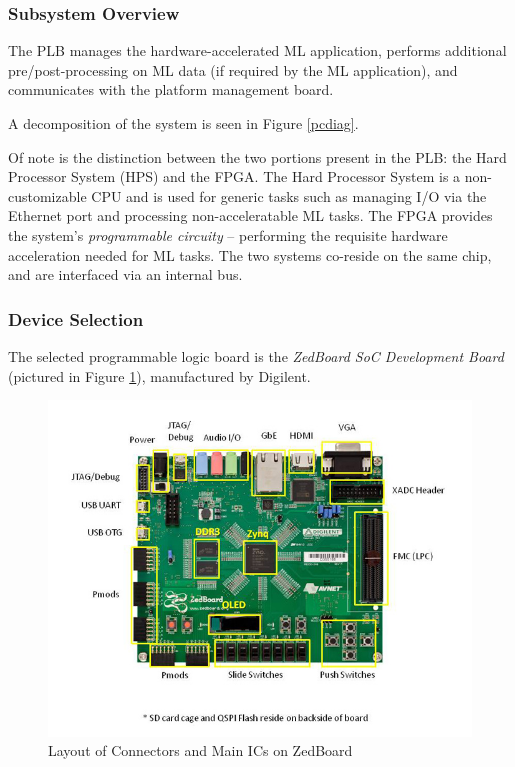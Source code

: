 \subsubsection{Subsystem Overview}
 The PLB manages the hardware-accelerated ML application, performs additional pre/post-processing on ML data (if required by the ML application), and communicates with the platform management board.

A decomposition of the system is seen in Figure \ref{pcdiag}.

Of note is the distinction between the two portions present in the PLB: the Hard Processor System (HPS) and the FPGA. The Hard Processor System is a non-customizable CPU and is used for generic tasks such as managing I/O via the Ethernet port and processing non-acceleratable ML tasks. The FPGA provides the system's \textit{programmable circuity} -- performing the requisite hardware acceleration needed for ML tasks. The two systems co-reside on the same chip, and are interfaced via an internal bus.

\subsubsection{Device Selection}
The selected programmable logic board is the \textit{ZedBoard SoC Development Board} (pictured in Figure \ref{zedboard}), manufactured by Digilent. 

\begin{figure}
\centering
\includegraphics[width=12.5cm]{img/zedboard_functional_overview.jpg}
\caption[Layout of Connectors and Main ICs on ZedBoard]{Layout of Connectors and Main ICs on ZedBoard \cite{zedboard}}
\label{zedboard}
\end{figure}

